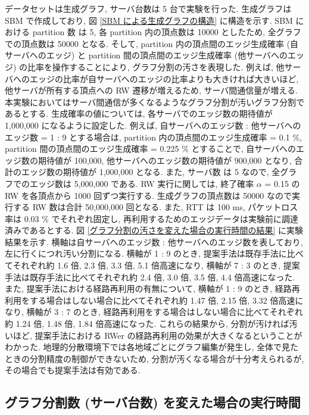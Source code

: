 データセットは生成グラフ, サーバ台数は 5 台で実験を行った. 生成グラフは SBM で作成しており, 図 \ref{SBM による生成グラフの構造} に構造を示す. SBM における partition 数 は 5, 各 partition 内の頂点数は 10000 としたため, 全グラフでの頂点数は 50000 となる. そして, partition 内の頂点間のエッジ生成確率 (自サーバへのエッジ) と partition 間の頂点間のエッジ生成確率 (他サーバへのエッジ) の比率を操作することにより, グラフ分割の汚さを表現した. 例えば, 他サーバへのエッジの比率が自サーバへのエッジの比率よりも大きければ大きいほど, 他サーバが所有する頂点への RW 遷移が増えるため, サーバ間通信量が増える.  本実験においてはサーバ間通信が多くなるようなグラフ分割が汚いグラフ分割であるとする. 生成確率の値については, 各サーバでのエッジ数の期待値が 1,000,000 になるように設定した. 例えば, 自サーバへのエッジ数 : 他サーバへのエッジ数 = 1 : 9 とする場合は, partition 内の頂点間のエッジ生成確率 = 0.1 \%, partition 間の頂点間のエッジ生成確率 = 0.225 \% とすることで, 自サーバへのエッジ数の期待値が 100,000, 他サーバへのエッジ数の期待値が 900,000 となり, 合計のエッジ数の期待値が 1,000,000 となる. また, サーバ数 は 5 なので, 全グラフでのエッジ数は 5,000,000 である. RW 実行に関しては, 終了確率 $\alpha$ = 0.15 の RW を各頂点から 1000 回ずつ実行する. 生成グラフの頂点数は 50000 なので実行する RW 数は合計 50,000,000 回となる. また, RTT は 100 ms, パケットロス率は 0.03 \% でそれぞれ固定し, 再利用するためのエッジデータは実験前に調達済みであるとする. 図 \ref{グラフ分割の汚さを変えた場合の実行時間の結果} に実験結果を示す. 横軸は自サーバへのエッジ数 : 他サーバへのエッジ数を表しており, 左に行くにつれ汚い分割になる. 横軸が 1 : 9 のとき, 提案手法は既存手法に比べてそれぞれ約 1.6 倍, 2.3 倍, 3.3 倍, 5.1 倍高速になり, 横軸が 7 : 3 のとき, 提案手法は既存手法に比べてそれぞれ約 2.4 倍, 3.0 倍, 3.5 倍, 4.4 倍高速になった. また, 提案手法における経路再利用の有無について, 横軸が 1 : 9 のとき, 経路再利用をする場合はしない場合に比べてそれぞれ約 1.47 倍, 2.15 倍, 3.32 倍高速になり, 横軸が 3 : 7 のとき, 経路再利用をする場合はしない場合に比べてそれぞれ約 1.24 倍, 1.48 倍, 1.84 倍高速になった. これらの結果から, 分割が汚ければ汚いほど, 提案手法における RWer の経路再利用の効果が大きくなるということがわかった. 地理的分散環境下では各地域ごとにグラフ編集が発生し, 全体で見たときの分割精度の制御ができないため, 分割が汚くなる場合が十分考えられるが, その場合でも提案手法は有効である. 

\subsection{グラフ分割数 (サーバ台数) を変えた場合の実行時間}\label{グラフ分割数を変えた場合の実行時間}

